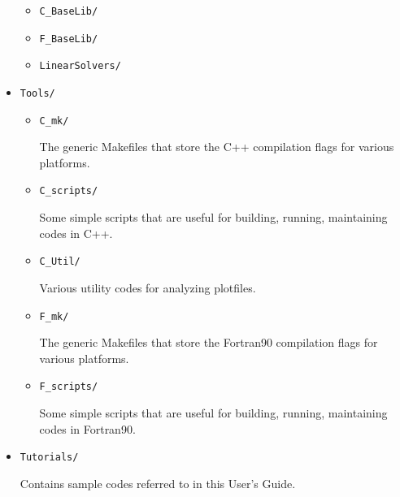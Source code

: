 \begin{itemize}
\begin{itemize}
  \item {\tt C\_BaseLib/}
  \item {\tt F\_BaseLib/}
  \item {\tt LinearSolvers/}

  \end{itemize}

\item {\tt Tools/}

  \begin{itemize}

  \item {\tt C\_mk/}

  The generic Makefiles that store the C++ compilation flags for
  various platforms.

  \item {\tt C\_scripts/}

  Some simple scripts that are useful for building, running,
  maintaining codes in C++.

  \item {\tt C\_Util/}

  Various utility codes for analyzing plotfiles.

  \item {\tt F\_mk/}

  The generic Makefiles that store the Fortran90 compilation flags for
  various platforms.

  \item {\tt F\_scripts/}

  Some simple scripts that are useful for building, running,
  maintaining codes in Fortran90.

  \end{itemize}

\item {\tt Tutorials/}

  Contains sample codes referred to in this User's Guide.

\end{itemize}
